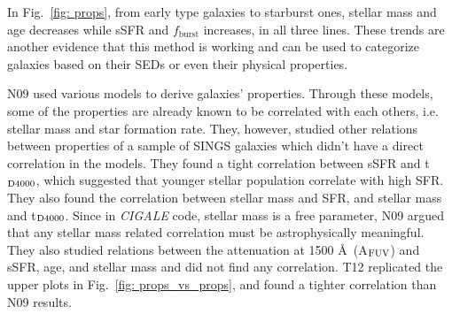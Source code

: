         In Fig.~\ref{fig: props}, from early type galaxies to starburst ones, stellar mass and age decreases while sSFR and $f_\mathrm{burst}$ increases, in all three lines. 
        These trends are another evidence that this method is working and can be used to categorize galaxies based on their SEDs or even their physical properties. %
        
    
        N09 used various models to derive galaxies' properties.
        Through these models, some of the properties are already known to be correlated with each others, i.e. stellar mass and star formation rate.
        They, however, studied other relations between properties of a sample of SINGS galaxies which didn't have a direct correlation in the models. %
        They found a tight correlation between sSFR and t$_{\rm {D4000}}$, which suggested that younger stellar population correlate with high SFR.
        They also found the correlation between stellar mass and SFR, and stellar mass and t$_{\rm {D4000}}$.
        Since in {\em CIGALE} code, stellar mass is a free parameter, N09 argued that any stellar mass related correlation must be astrophysically meaningful. 
        They also studied relations between the attenuation at 1500 \AA~(A$_{\rm {FUV}}$) and sSFR, age, and stellar mass and did not find any correlation.
        T12 replicated the upper plots in Fig.~\ref{fig: props_vs_props}, and found a tighter correlation than N09 results. 
        
